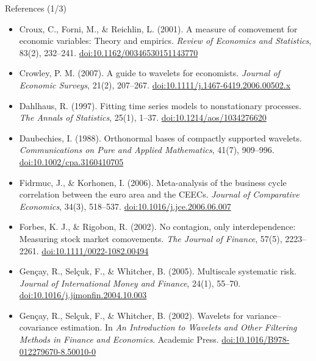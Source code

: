 \begin{frame}{References (1/3)}
\begin{itemize}
    \item Croux, C., Forni, M., \& Reichlin, L. (2001). A measure of comovement for economic variables: Theory and empirics. \textit{Review of Economics and Statistics}, 83(2), 232--241. \href{https://doi.org/10.1162/00346530151143770}{doi:10.1162/00346530151143770}
    \item Crowley, P. M. (2007). A guide to wavelets for economists. \textit{Journal of Economic Surveys}, 21(2), 207--267. \href{https://doi.org/10.1111/j.1467-6419.2006.00502.x}{doi:10.1111/j.1467-6419.2006.00502.x}
    \item Dahlhaus, R. (1997). Fitting time series models to nonstationary processes. \textit{The Annals of Statistics}, 25(1), 1--37. \href{https://doi.org/10.1214/aos/1034276620}{doi:10.1214/aos/1034276620}
    \item Daubechies, I. (1988). Orthonormal bases of compactly supported wavelets. \textit{Communications on Pure and Applied Mathematics}, 41(7), 909--996. \href{https://doi.org/10.1002/cpa.3160410705}{doi:10.1002/cpa.3160410705}
    \item Fidrmuc, J., \& Korhonen, I. (2006). Meta-analysis of the business cycle correlation between the euro area and the CEECs. \textit{Journal of Comparative Economics}, 34(3), 518--537. \href{https://doi.org/10.1016/j.jce.2006.06.007}{doi:10.1016/j.jce.2006.06.007}
    \item Forbes, K. J., \& Rigobon, R. (2002). No contagion, only interdependence: Measuring stock market comovements. \textit{The Journal of Finance}, 57(5), 2223--2261. \href{https://doi.org/10.1111/0022-1082.00494}{doi:10.1111/0022-1082.00494}
    \item Gençay, R., Selçuk, F., \& Whitcher, B. (2005). Multiscale systematic risk. \textit{Journal of International Money and Finance}, 24(1), 55--70. \href{https://doi.org/10.1016/j.jimonfin.2004.10.003}{doi:10.1016/j.jimonfin.2004.10.003}
    \item Gençay, R., Selçuk, F., \& Whitcher, B. (2002). Wavelets for variance--covariance estimation. In \textit{An Introduction to Wavelets and Other Filtering Methods in Finance and Economics}. Academic Press. \href{https://doi.org/10.1016/B978-012279670-8.50010-0}{doi:10.1016/B978-012279670-8.50010-0}
\end{itemize}
\end{frame}

